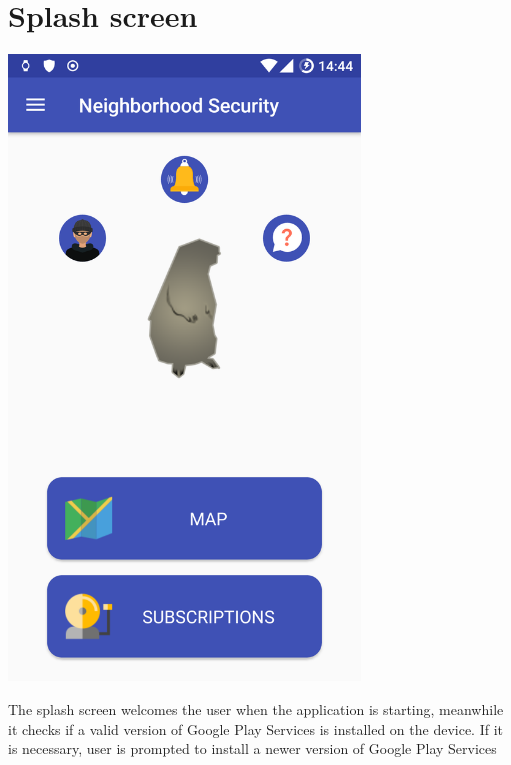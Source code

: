 \documentclass[a4paper]{scrreprt}
\begin{document}
\section{Splash screen}

\begin{minipage}{0.5\textwidth}
	\centering
	\includegraphics[width=0.7\textwidth]{home}
\end{minipage}
\begin{minipage}{0.5\textwidth}
	The splash screen welcomes the user when the application is starting, meanwhile it checks if a valid version of Google Play Services is installed on the device. If it is necessary, user is prompted to install a newer version of Google Play Services
\end{minipage}
\end{document}
